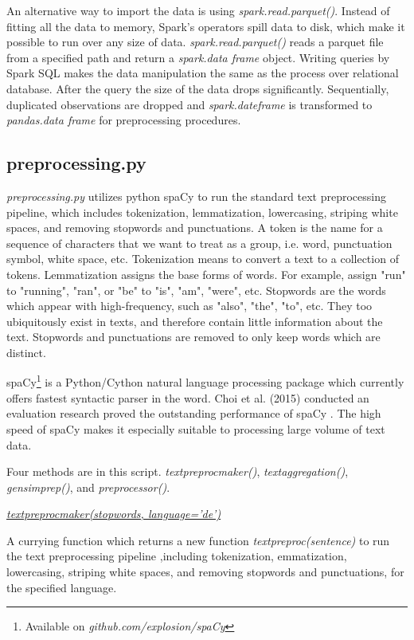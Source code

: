 \documentclass{article} %
\begin{document}
    An alternative way to import the data is using \textit{spark.read.parquet()}. Instead of fitting all the data to memory, Spark's operators spill data to disk, which make it possible to run over any size of data. \textit{spark.read.parquet()} reads a parquet file from a specified path and return a \textit{spark.data frame} object. Writing queries by Spark SQL makes the data manipulation the same as the process over relational database. After the query the size of the data drops significantly. Sequentially, duplicated observations are dropped and \textit{spark.dateframe} is transformed to \textit{pandas.data frame} for preprocessing procedures.

    \subsection{preprocessing.py}
    \textit{preprocessing.py} utilizes python spaCy to run the standard text preprocessing pipeline, which includes tokenization, lemmatization, lowercasing, striping white spaces, and removing stopwords and punctuations. A token is the name for a sequence of characters that we want to treat as a group, i.e. word, punctuation symbol, white space, etc. Tokenization means to convert a text to a collection of tokens. Lemmatization assigns the base forms of words. For example, assign "run" to "running", "ran", or "be" to "is", "am", "were", etc. Stopwords are the words which appear with high-frequency, such as "also", "the", "to", etc. They too ubiquitously exist in texts, and therefore contain little information about the text. Stopwords and punctuations are removed to only keep words which are distinct.

    spaCy\footnote{Available on \textit{github.com/explosion/spaCy}} is a Python/Cython natural language processing package which currently offers fastest syntactic parser in the word. Choi et al. (2015) conducted an evaluation research proved the outstanding performance of spaCy \cite{choi_it_2015}. The high speed of spaCy makes it especially suitable to processing large volume of text data.

    Four methods are in this script. \textit{text\textunderscore{}preproc\textunderscore{}maker()}, \textit{text\textunderscore{}aggregation()}, \textit{gensim\textunderscore{}prep()}, and \textit{preprocessor()}.

    \underline{\textit{text\textunderscore{}preproc\textunderscore{}maker(stopwords, language='de')}}

    A currying function which returns a new function \textit{text\textunderscore{}preproc(sentence)} to run the text preprocessing pipeline ,including tokenization, emmatization, lowercasing, striping white spaces, and removing stopwords and punctuations, for the specified language.
\end{document}
